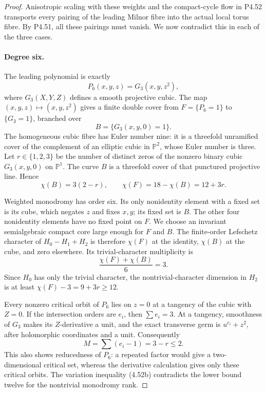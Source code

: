 \begin{proof}
Anisotropic scaling with these weights and the compact-cycle
flow in P4.52 transports every pairing of the leading
Milnor fibre into the actual local torus fibre. By P4.51,
all these pairings must vanish. We now contradict this
in each of the three cases.

\paragraph{Degree six.}
The leading polynomial is exactly
\[
                    P_6(x,y,z)=G_3(x,y,z^2),
\]
where $G_3(X,Y,Z)$ defines a smooth projective cubic.
The map $(x,y,z)\mapsto(x,y,z^2)$ gives a finite double
cover from $F=\{P_6=1\}$ to $\{G_3=1\}$, branched over
\[
                       B=\{G_3(x,y,0)=1\}.
\]
The homogeneous cubic fibre has Euler number nine: it
is a threefold unramified cover of the complement of
an elliptic cubic in $\mathbb P^2$, whose Euler number
is three. Let $r\in\{1,2,3\}$ be the number of distinct
zeros of the nonzero binary cubic $G_3(x,y,0)$ on
$\mathbb P^1$. The curve $B$ is a threefold cover of
that punctured projective line. Hence
\[
          \chi(B)=3(2-r),\qquad \chi(F)=18-\chi(B)=12+3r.
\]

Weighted monodromy has order six. Its only
nonidentity element with a fixed set is its cube,
which negates $z$ and fixes $x,y$; its fixed set is
$B$. The other four nonidentity elements have no
fixed point on $F$. We choose an invariant
semialgebraic compact core large enough for $F$
and $B$. The finite-order Lefschetz character of
$H_0-H_1+H_2$ is therefore $\chi(F)$ at the identity,
$\chi(B)$ at the cube, and zero elsewhere. Its
trivial-character multiplicity is
\[
                       \frac{\chi(F)+\chi(B)}6=3.
\]
Since $H_0$ has only the trivial character, the
nontrivial-character dimension in $H_2$ is at least
$\chi(F)-3=9+3r\ge12$.

Every nonzero critical orbit of $P_6$ lies on $z=0$
at a tangency of the cubic with $Z=0$. If the
intersection orders are $e_i$, then $\sum e_i=3$.
At a tangency, smoothness of $G_3$ makes its
$Z$-derivative a unit, and the exact transverse
germ is $u^{e_i}+z^2$, after holomorphic coordinates
and a unit. Consequently
\[
                       M=\sum(e_i-1)=3-r\le2.
\]
This also shows reducedness of $P_6$: a repeated
factor would give a two-dimensional critical set,
whereas the derivative calculation gives only
these critical orbits. The variation inequality
(4.52b) contradicts the lower bound twelve for
the nontrivial monodromy rank.


\end{proof}
